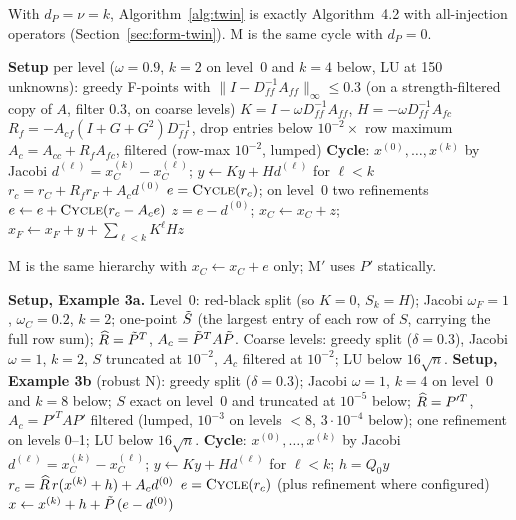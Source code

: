 With $d_P=\nu=k$, Algorithm~\ref{alg:twin} is exactly Algorithm~4.2 with all-injection operators
(Section~\ref{sec:form-twin}). M is the same cycle with $d_P=0$.

\begin{algorithm}[t]
\caption{(Example 2) Semi-Markovian V-cycle (parametrized Algorithm~7.2).}\label{alg:semi}
\begin{algorithmic}[1]
\Statex \textbf{Setup} per level ($\omega=0.9$, $k=2$ on level~0 and $k=4$ below, LU at 150 unknowns):
\State greedy F-points with $\|I-D_{ff}^{-1}A_{ff}\|_\infty\le0.3$ (on a strength-filtered copy of $A$, filter
  $0.3$, on coarse levels)
\State $K=I-\omega D_{ff}^{-1}A_{ff}$, \quad $H=-\omega D_{ff}^{-1}A_{fc}$
\State $R_f=-A_{cf}(I+G+G^2)D_{ff}^{-1}$, drop entries below $10^{-2}\times$ row maximum
\State $A_c=A_{cc}+R_fA_{fc}$, filtered (row-max $10^{-2}$, lumped)
\Statex \textbf{Cycle}:
\State $x^{(0)},\dots,x^{(k)}$ by Jacobi
\State $d^{(\ell)}=x^{(k)}_C-x^{(\ell)}_C$; \quad $y\leftarrow Ky+Hd^{(\ell)}$ for $\ell<k$
\State $r_c=r_C+R_fr_F+A_cd^{(0)}$
\State $e=\textsc{Cycle}(r_c)$; on level~0 two refinements $e\leftarrow e+\textsc{Cycle}(r_c-A_ce)$
\State $z=e-d^{(0)}$; \quad $x_C\leftarrow x_C+z$; \quad $x_F\leftarrow x_F+y+\sum_{\ell<k}K^\ell Hz$
\end{algorithmic}
\end{algorithm}

M is the same hierarchy with $x_C\leftarrow x_C+e$ only; M$'$ uses $P'$ statically.

\begin{algorithm}[t]
\caption{(Examples 3a and 3b) Non-Markovian V-cycle (Algorithm~7.3 family).}\label{alg:trueN}
\begin{algorithmic}[1]
\Statex \textbf{Setup, Example 3a.} Level~0: red-black split (so $K=0$, $S_k=H$); Jacobi $\omega_F=1$,
  $\omega_C=0.2$, $k=2$; one-point $\tilde S$ (the largest entry of each row of $S$, carrying the full row sum);
  $\widehat R=\tilde P^T$, $A_c=\tilde P^TA\tilde P$. Coarse levels: greedy split ($\delta=0.3$), Jacobi $\omega=1$, $k=2$, $S$ truncated
  at $10^{-2}$, $A_c$ filtered at $10^{-2}$; LU below $16\sqrt n$.
\Statex \textbf{Setup, Example 3b} (robust N): greedy split ($\delta=0.3$); Jacobi $\omega=1$, $k=4$ on level~0 and
  $k=8$ below; $S$ exact on level~0 and truncated at $10^{-5}$ below; $\widehat R=P'^T$, $A_c=P'^TAP'$ filtered (lumped,
  $10^{-3}$ on levels $<8$, $3\cdot10^{-4}$ below); one refinement on levels 0--1; LU below $16\sqrt n$.
\Statex \textbf{Cycle}:
\State $x^{(0)},\dots,x^{(k)}$ by Jacobi
\State $d^{(\ell)}=x^{(k)}_C-x^{(\ell)}_C$; \quad $y\leftarrow Ky+Hd^{(\ell)}$ for $\ell<k$; \quad $h=Q_0y$
\State $r_c=\widehat R\, r(x^{(k)}+h)+A_cd^{(0)}$
\State $e=\textsc{Cycle}(r_c)$ (plus refinement where configured)
\State $x\leftarrow x^{(k)}+h+\tilde P\,(e-d^{(0)})$
\end{algorithmic}
\end{algorithm}

